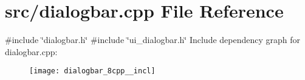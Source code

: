 \section{src/dialogbar.cpp File Reference}
\label{dialogbar_8cpp}
{\ttfamily \#include \char`\"{}dialogbar.\+h\char`\"{}}\newline
{\ttfamily \#include \char`\"{}ui\+\_\+dialogbar.\+h\char`\"{}}\newline
Include dependency graph for dialogbar.\+cpp\+:\nopagebreak
\begin{figure}[H]
\begin{center}
\leavevmode
\texttt{[image: dialogbar\_8cpp\_\_incl]}
\end{center}
\end{figure}
